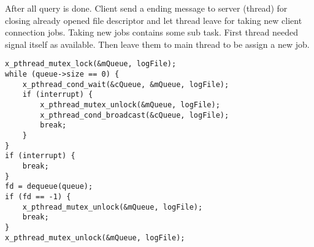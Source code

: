 \documentclass{article}
\begin{document}
After all query is done. Client send a ending message to server (thread) for closing already opened file descriptor and let thread leave for taking new client connection jobs. Taking new jobs contains some sub task. First thread needed signal itself as available. Then leave them to main thread to be assign a new job.\\
\begin{lstlisting}[style=CStyle]
x_pthread_mutex_lock(&mQueue, logFile);
while (queue->size == 0) {
    x_pthread_cond_wait(&cQueue, &mQueue, logFile);
    if (interrupt) {
        x_pthread_mutex_unlock(&mQueue, logFile);
        x_pthread_cond_broadcast(&cQueue, logFile);
        break;
    }
}
if (interrupt) {
    break;
}
fd = dequeue(queue);
if (fd == -1) {
    x_pthread_mutex_unlock(&mQueue, logFile);
    break;
}
x_pthread_mutex_unlock(&mQueue, logFile);
\end{lstlisting}
\end{document}
